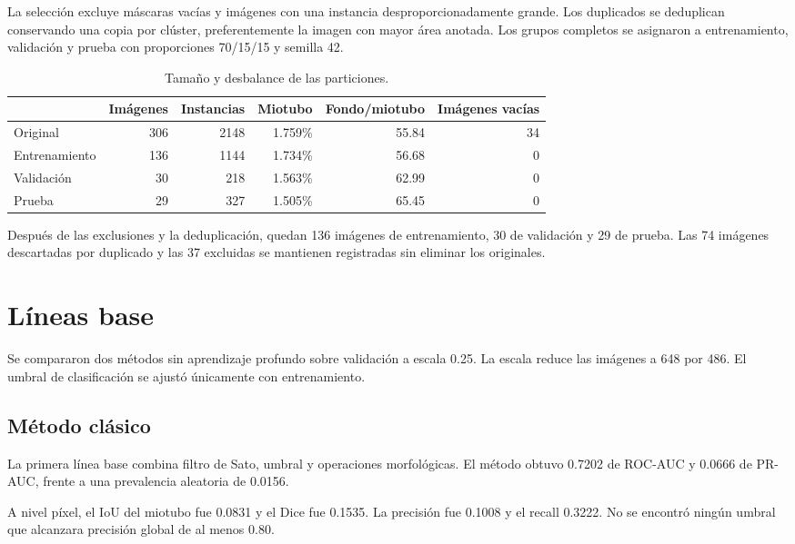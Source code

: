 \documentclass[11pt,a4paper]{article}
\begin{document}
La selección excluye máscaras vacías y imágenes con una instancia desproporcionadamente grande. Los duplicados se deduplican conservando una copia por clúster, preferentemente la imagen con mayor área anotada. Los grupos completos se asignaron a entrenamiento, validación y prueba con proporciones 70/15/15 y semilla 42.

\begin{table}[H]
\centering
\caption{Tamaño y desbalance de las particiones.}
\begin{tabular}{lrrrrr}
\toprule & \multicolumn{1}{c}{Imágenes} & \multicolumn{1}{c}{Instancias} & \multicolumn{1}{c}{Miotubo} & \multicolumn{1}{c}{Fondo/miotubo} & \multicolumn{1}{c}{Imágenes vacías}\\
\midrule
Original & 306 & 2148 & 1.759\% & 55.84 & 34\\
Entrenamiento & 136 & 1144 & 1.734\% & 56.68 & 0\\
Validación & 30 & 218 & 1.563\% & 62.99 & 0\\
Prueba & 29 & 327 & 1.505\% & 65.45 & 0\\
\bottomrule
\end{tabular}
\label{tab:particion}
\end{table}

Después de las exclusiones y la deduplicación, quedan 136 imágenes de entrenamiento, 30 de validación y 29 de prueba. Las 74 imágenes descartadas por duplicado y las 37 excluidas se mantienen registradas sin eliminar los originales.

\section{Líneas base}

Se compararon dos métodos sin aprendizaje profundo sobre validación a escala 0.25. La escala reduce las imágenes a 648 por 486. El umbral de clasificación se ajustó únicamente con entrenamiento.

\subsection{Método clásico}

La primera línea base combina filtro de Sato, umbral y operaciones morfológicas. El método obtuvo 0.7202 de ROC-AUC y 0.0666 de PR-AUC, frente a una prevalencia aleatoria de 0.0156.

A nivel píxel, el IoU del miotubo fue 0.0831 y el Dice fue 0.1535. La precisión fue 0.1008 y el recall 0.3222. No se encontró ningún umbral que alcanzara precisión global de al menos 0.80.
\end{document}
